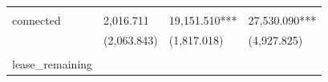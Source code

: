 \documentclass[]{book}
\begin{document}
\begin{longtable}[]{@{}llll@{}}
\begin{minipage}[t]{0.24\columnwidth}
\strut
\end{minipage} & \begin{minipage}[t]{0.24\columnwidth}\raggedright\strut
\strut
\end{minipage} & \begin{minipage}[t]{0.24\columnwidth}\raggedright\strut
\strut
\end{minipage}\tabularnewline
\begin{minipage}[t]{0.17\columnwidth}\raggedright\strut
connected\strut
\end{minipage} & \begin{minipage}[t]{0.24\columnwidth}\raggedright\strut
2,016.711\strut
\end{minipage} & \begin{minipage}[t]{0.24\columnwidth}\raggedright\strut
19,151.510***\strut
\end{minipage} & \begin{minipage}[t]{0.24\columnwidth}\raggedright\strut
27,530.090***\strut
\end{minipage}\tabularnewline
\begin{minipage}[t]{0.17\columnwidth}\raggedright\strut
\strut
\end{minipage} & \begin{minipage}[t]{0.24\columnwidth}\raggedright\strut
(2,063.843)\strut
\end{minipage} & \begin{minipage}[t]{0.24\columnwidth}\raggedright\strut
(1,817.018)\strut
\end{minipage} & \begin{minipage}[t]{0.24\columnwidth}\raggedright\strut
(4,927.825)\strut
\end{minipage}\tabularnewline
\begin{minipage}[t]{0.17\columnwidth}\raggedright\strut
\strut
\end{minipage} & \begin{minipage}[t]{0.24\columnwidth}\raggedright\strut
\strut
\end{minipage} & \begin{minipage}[t]{0.24\columnwidth}\raggedright\strut
\strut
\end{minipage} & \begin{minipage}[t]{0.24\columnwidth}\raggedright\strut
\strut
\end{minipage}\tabularnewline
\begin{minipage}[t]{0.17\columnwidth}\raggedright\strut
lease\_remaining\strut
\end{minipage} & \begin{minipage}[t]{0.24\columnwidth}\raggedright\strut

\end{minipage}
\end{longtable}
\end{document}
